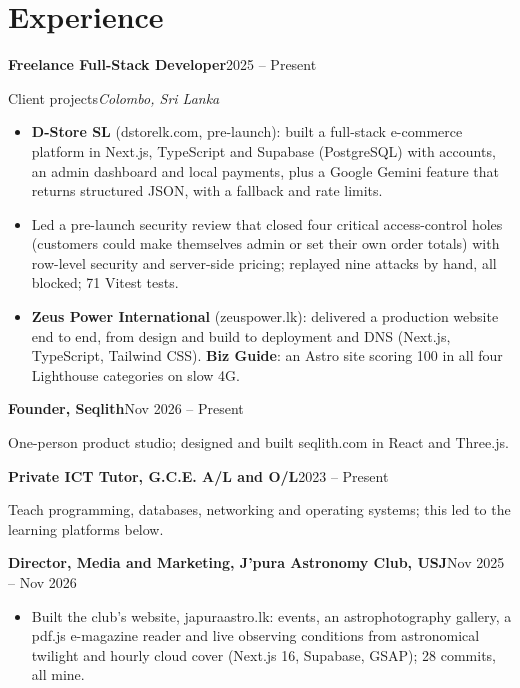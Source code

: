 \documentclass[10pt,a4paper]{article}
\newcommand{\entry}[4]{%
  \textbf{#1}\hfill #2\par
  \ifx\relax#3\relax\else{\itshape #3}\hfill{\itshape #4}\par\fi
}
\begin{document}
\section{Experience}
\entry{Freelance Full-Stack Developer}{2025 -- Present}{Client projects}{Colombo, Sri Lanka}
\begin{itemize}
  \item \textbf{D-Store SL} (dstorelk.com, pre-launch): built a full-stack e-commerce platform in Next.js, TypeScript and Supabase (PostgreSQL) with accounts, an admin dashboard and local payments, plus a Google Gemini feature that returns structured JSON, with a fallback and rate limits.
  \item Led a pre-launch security review that closed four critical access-control holes (customers could make themselves admin or set their own order totals) with row-level security and server-side pricing; replayed nine attacks by hand, all blocked; 71 Vitest tests.
  \item \textbf{Zeus Power International} (zeuspower.lk): delivered a production website end to end, from design and build to deployment and DNS (Next.js, TypeScript, Tailwind CSS). \textbf{Biz Guide}: an Astro site scoring 100 in all four Lighthouse categories on slow 4G.
\end{itemize}
\entry{Founder, Seqlith}{Nov 2026 -- Present}{}{}
One-person product studio; designed and built seqlith.com in React and Three.js.\par\vspace{0.25em}
\entry{Private ICT Tutor, G.C.E. A/L and O/L}{2023 -- Present}{}{}
Teach programming, databases, networking and operating systems; this led to the learning platforms below.\par\vspace{0.25em}
\entry{Director, Media and Marketing, J'pura Astronomy Club, USJ}{Nov 2025 -- Nov 2026}{}{}
\begin{itemize}
  \item Built the club's website, japuraastro.lk: events, an astrophotography gallery, a pdf.js e-magazine reader and live observing conditions from astronomical twilight and hourly cloud cover (Next.js 16, Supabase, GSAP); 28 commits, all mine.
\end{itemize}

\end{document}
